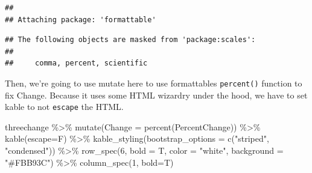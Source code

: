 \documentclass[
]{book}
\newenvironment{Shaded}{\begin{snugshade}}{\end{snugshade}}
\newcommand{\AttributeTok}[1]{\textcolor[rgb]{0.77,0.63,0.00}{#1}}
\newcommand{\DecValTok}[1]{\textcolor[rgb]{0.00,0.00,0.81}{#1}}
\newcommand{\FunctionTok}[1]{\textcolor[rgb]{0.00,0.00,0.00}{#1}}
\newcommand{\NormalTok}[1]{#1}
\newcommand{\SpecialCharTok}[1]{\textcolor[rgb]{0.00,0.00,0.00}{#1}}
\newcommand{\StringTok}[1]{\textcolor[rgb]{0.31,0.60,0.02}{#1}}
\begin{document}
\begin{verbatim}
## 
## Attaching package: 'formattable'
\end{verbatim}

\begin{verbatim}
## The following objects are masked from 'package:scales':
## 
##     comma, percent, scientific
\end{verbatim}

Then, we're going to use mutate here to use formattables \texttt{percent()} function to fix Change. Because it uses some HTML wizardry under the hood, we have to set kable to not \texttt{escape} the HTML.

\begin{Shaded}
\begin{Highlighting}[]
\NormalTok{threechange }\SpecialCharTok{\%\textgreater{}\%}
  \FunctionTok{mutate}\NormalTok{(}\AttributeTok{Change =} \FunctionTok{percent}\NormalTok{(PercentChange)) }\SpecialCharTok{\%\textgreater{}\%}
  \FunctionTok{kable}\NormalTok{(}\AttributeTok{escape=}\NormalTok{F) }\SpecialCharTok{\%\textgreater{}\%} 
  \FunctionTok{kable\_styling}\NormalTok{(}\AttributeTok{bootstrap\_options =} \FunctionTok{c}\NormalTok{(}\StringTok{"striped"}\NormalTok{, }\StringTok{"condensed"}\NormalTok{)) }\SpecialCharTok{\%\textgreater{}\%}
  \FunctionTok{row\_spec}\NormalTok{(}\DecValTok{6}\NormalTok{, }\AttributeTok{bold =}\NormalTok{ T, }\AttributeTok{color =} \StringTok{"white"}\NormalTok{, }\AttributeTok{background =} \StringTok{"\#FBB93C"}\NormalTok{) }\SpecialCharTok{\%\textgreater{}\%}
  \FunctionTok{column\_spec}\NormalTok{(}\DecValTok{1}\NormalTok{, }\AttributeTok{bold=}\NormalTok{T)}
\end{Highlighting}
\end{Shaded}
\end{document}
